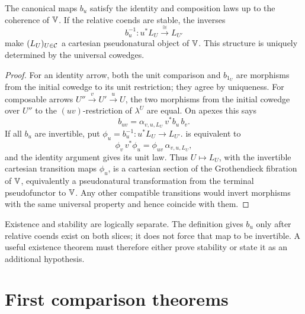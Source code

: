 \begin{theorem}
\label{thm:assembly}
The canonical maps \(b_u\) satisfy the identity and composition laws up to
the coherence of \(\mathbb{V}\).  If the relative coends are stable, the inverses
\[
  b_u^{-1}:u^*L_U\xrightarrow{\ \cong\ }L_{U'}
\]
make \((L_U)_{U\in\mathcal{C}}\) a cartesian pseudonatural object of \(\mathbb{V}\).  This
structure is uniquely determined by the universal cowedges.
\end{theorem}

\begin{proof}
For an identity arrow, both the unit comparison and \(b_{1_U}\) are
morphisms from the initial cowedge to its unit restriction; they agree by
uniqueness.  For composable arrows \(U''\xrightarrow{v}U'\xrightarrow{u}U\),
the two morphisms from the initial cowedge over \(U''\) to the
\((uv)\)-restriction of \(\lambda^U\) are equal.  On apexes this says
\begin{equation}
  b_{uv}
  =\alpha_{v,u,L_U}\,v^*b_u\,b_v.
  \label{eq:b-composition}
\end{equation}
If all \(b_u\) are invertible, put
\(\phi_u=b_u^{-1}:u^*L_U\to L_{U'}\).
 is equivalent to
\begin{equation}
  \phi_v\,v^*\phi_u
  =\phi_{uv}\,\alpha_{v,u,L_U},
  \label{eq:phi-composition}
\end{equation}
and the identity argument gives its unit law.  Thus \(U\mapsto L_U\), with
the invertible cartesian transition maps \(\phi_u\), is a cartesian section
of the Grothendieck fibration of \(\mathbb{V}\), equivalently a pseudonatural
transformation from the terminal pseudofunctor to \(\mathbb{V}\).  Any other
compatible transitions would invert morphisms with the same universal
property and hence coincide with them.
\end{proof}

\begin{remark}
\label{rem:existence-vs-stability}
Existence and stability are logically separate.  The definition gives
\(b_u\) only after relative coends exist on both slices; it does not force
that map to be invertible.  A useful existence theorem must therefore either
prove stability or state it as an additional hypothesis.
\end{remark}


\section{First comparison theorems}
\label{sec:comparisons}

